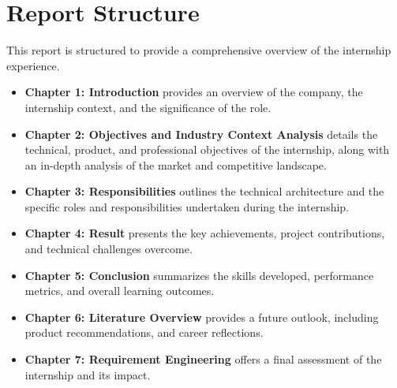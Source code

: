 \section{Report Structure}
This report is structured to provide a comprehensive overview of the internship experience.
\begin{itemize}
    \item \textbf{Chapter 1: Introduction} provides an overview of the company, the internship context, and the significance of the role.
    \item \textbf{Chapter 2: Objectives and Industry Context Analysis} details the technical, product, and professional objectives of the internship, along with an in-depth analysis of the market and competitive landscape.
    \item \textbf{Chapter 3: Responsibilities} outlines the technical architecture and the specific roles and responsibilities undertaken during the internship.
    \item \textbf{Chapter 4: Result} presents the key achievements, project contributions, and technical challenges overcome.
    \item \textbf{Chapter 5: Conclusion} summarizes the skills developed, performance metrics, and overall learning outcomes.
    \item \textbf{Chapter 6: Literature Overview} provides a future outlook, including product recommendations, and career reflections.
    \item \textbf{Chapter 7: Requirement Engineering} offers a final assessment of the internship and its impact.
\end{itemize}